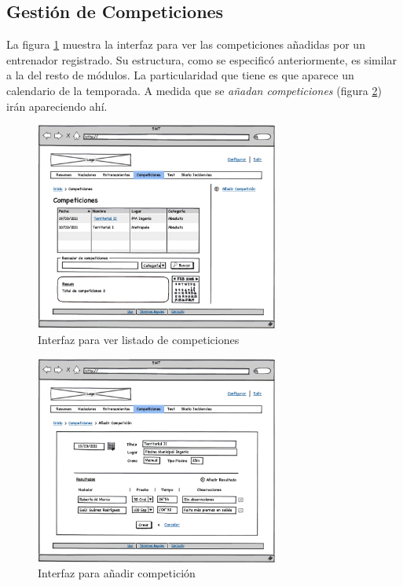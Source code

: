   	\subsection{Gestión de Competiciones} %
  		\label{sub:gestion_de_competiciones}

  	La figura \ref{fig:interfaz_competiciones} muestra la interfaz para ver las competiciones añadidas por un entrenador registrado. Su estructura, como se especificó anteriormente, es similar a la del resto de módulos. La particularidad que tiene es que aparece un calendario de la temporada. A medida que se {\it añadan competiciones} (figura \ref{fig:interfaz_competiciones_new}) irán apareciendo ahí. 

  		\begin{figure}[H]
  		  \centering
  		    \includegraphics[width=8cm]{./eps/p_interfaz/14_Competiciones.eps}
  		  \caption{Interfaz para ver listado de competiciones}
  		  \label{fig:interfaz_competiciones}
  		\end{figure}

  		\begin{figure}[H]
  		  \centering
  		    \includegraphics[width=8cm]{./eps/p_interfaz/15_Competiciones_new.eps}
  		  \caption{Interfaz para añadir competición}
  		  \label{fig:interfaz_competiciones_new}
  		\end{figure}


